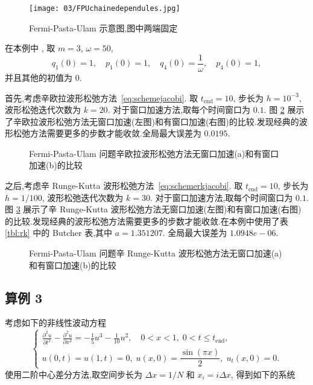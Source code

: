 \begin{figure}[h!]
  \centering
  \texttt{[image: 03/FPUchainedependules.jpg]}
  \caption{Fermi-Pasta-Ulam 示意图,图中两端固定}
  \label{fig:fpu}
\end{figure}

在本例中 \cite{hairer2006geometric}, 取 $m=3$, $\omega = 50$,
\begin{equation*}
  q_1(0) = 1, \quad p_1(0) = 1, \quad q_4(0) = \frac{1}{\omega}, \quad p_4(0) = 1,
\end{equation*}
并且其他的初值为 $0$.

首先,考虑辛欧拉波形松弛方法~\eqref{eq:schemejacobi}. 取 $t_{\text{end}} = 10$, 步长为 $h = 10^{-3}$, 波形松弛迭代次数为 $k=20$. 对于窗口加速方法,取每个时间窗口为 $0.1$. 图 \ref{fig:ex2seucom} 展示了辛欧拉波形松弛方法无窗口加速(左图)和有窗口加速(右图)的比较.发现经典的波形松弛方法需要更多的步数才能收敛.全局最大误差为 $0.0195$.

\begin{figure}[h!]
  \centering
  \caption{Fermi-Pasta-Ulam 问题辛欧拉波形松弛方法无窗口加速(a)和有窗口加速(b)的比较}
  \label{fig:ex2seucom}
\end{figure}

之后,考虑辛 Runge-Kutta 波形松弛方法~\eqref{eq:schemerkjacobi}. 取 $t_{\text{end}} = 10$, 步长为 $h = 1/100$, 波形松弛迭代次数为 $k=30$. 对于窗口加速方法,取每个时间窗口为 $0.1$. 图 \ref{fig:ex2srkcom} 展示了辛 Runge-Kutta 波形松弛方法无窗口加速(左图)和有窗口加速(右图)的比较.发现经典的波形松弛方法需要更多的步数才能收敛.在本例中使用了表 \ref{tbl:rk} 中的 Butcher 表,其中 $a = 1.351207$. 全局最大误差为 $1.0948e-06$.

\begin{figure}[h!]
  \centering
  \caption{Fermi-Pasta-Ulam 问题辛 Runge-Kutta 波形松弛方法无窗口加速(a)和有窗口加速(b)的比较}
  \label{fig:ex2srkcom}
\end{figure}

\subsection*{算例 3}
考虑如下的非线性波动方程 \cite{wu2013struc}
\begin{equation}\label{eq:nonlinwave}
  \left \{ \begin{array}{l}
      \displaystyle \frac{\partial^2 u }{\partial t^2}
      - \frac{\partial^2 u}{\partial x^2}
      = -\frac{1}{5} u^3 - \frac{1}{10} u^2, \quad 0<x<1, \; 0<t \leq t_{\text{end}},\\
      u(0,t) = u(1,t) = 0, \; u(x, 0) = \dfrac{\sin(\pi x)}{2}, \; u_t (x, 0) = 0.
    \end{array} \right.
\end{equation}
使用二阶中心差分方法,取空间步长为 $\Delta x = 1/N$ 和 $x_i = i \Delta x$, 得到如下的系统

